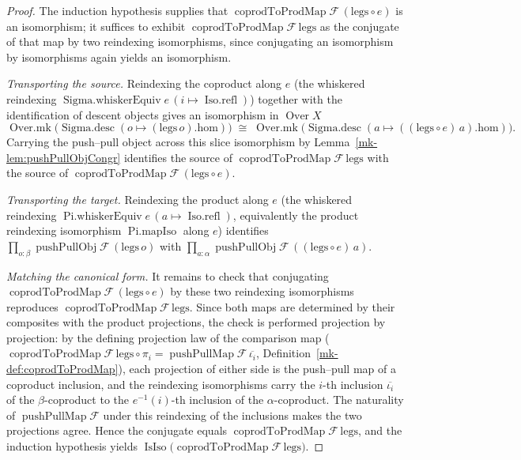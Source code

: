 \begin{proof}
  The induction hypothesis supplies that
  \(\operatorname{coprodToProdMap}\mathcal{F}\,(\mathrm{legs} \circ e)\) is an isomorphism; it suffices
  to exhibit \(\operatorname{coprodToProdMap}\mathcal{F}\,\mathrm{legs}\) as the conjugate of that map by
  two reindexing isomorphisms, since conjugating an isomorphism by isomorphisms again yields an
  isomorphism.

  \emph{Transporting the source.} Reindexing the coproduct along \(e\) (the whiskered reindexing
  \(\operatorname{Sigma.whiskerEquiv} e\,(i \mapsto \operatorname{Iso.refl})\)) together with the
  identification of descent objects gives an isomorphism in \(\operatorname{Over} X\)
  \[
    \operatorname{Over.mk}\bigl(\operatorname{Sigma.desc}(o \mapsto (\mathrm{legs}\,o).\mathrm{hom})\bigr)
      \;\cong\;
    \operatorname{Over.mk}\bigl(\operatorname{Sigma.desc}(a \mapsto ((\mathrm{legs} \circ e)\,a).
      \mathrm{hom})\bigr).
  \]
  Carrying the push--pull object across this slice isomorphism by
  Lemma~\ref{mk-lem:pushPullObjCongr} identifies the source of
  \(\operatorname{coprodToProdMap}\mathcal{F}\,\mathrm{legs}\) with the source of
  \(\operatorname{coprodToProdMap}\mathcal{F}\,(\mathrm{legs} \circ e)\).

  \emph{Transporting the target.} Reindexing the product along \(e\) (the whiskered reindexing
  \(\operatorname{Pi.whiskerEquiv} e\,(a \mapsto \operatorname{Iso.refl})\), equivalently the
  product reindexing isomorphism \(\operatorname{Pi.mapIso}\) along \(e\)) identifies
  \(\prod_{o : \beta} \operatorname{pushPullObj}\mathcal{F}\,(\mathrm{legs}\,o)\) with
  \(\prod_{a : \alpha} \operatorname{pushPullObj}\mathcal{F}\,((\mathrm{legs} \circ e)\,a)\).

  \emph{Matching the canonical form.} It remains to check that conjugating
  \(\operatorname{coprodToProdMap}\mathcal{F}\,(\mathrm{legs} \circ e)\) by these two reindexing
  isomorphisms reproduces \(\operatorname{coprodToProdMap}\mathcal{F}\,\mathrm{legs}\). Since both maps
  are determined by their composites with the product projections, the check is performed projection by
  projection: by the defining projection law of the comparison map
  (\(\operatorname{coprodToProdMap}\mathcal{F}\,\mathrm{legs} \circ \pi_i =
  \operatorname{pushPullMap}\mathcal{F}\,\overline{\iota_i}\), Definition~\ref{mk-def:coprodToProdMap}),
  each projection of either side is the push--pull map of a coproduct inclusion, and the reindexing
  isomorphisms carry the \(i\)-th inclusion \(\overline{\iota_i}\) of the \(\beta\)-coproduct to the
  \(e^{-1}(i)\)-th inclusion of the \(\alpha\)-coproduct. The naturality of
  \(\operatorname{pushPullMap}\mathcal{F}\) under this reindexing of the inclusions makes the two
  projections agree. Hence the conjugate equals
  \(\operatorname{coprodToProdMap}\mathcal{F}\,\mathrm{legs}\), and the induction hypothesis yields
  \(\operatorname{IsIso}\bigl(\operatorname{coprodToProdMap}\mathcal{F}\,\mathrm{legs}\bigr)\).
\end{proof}

